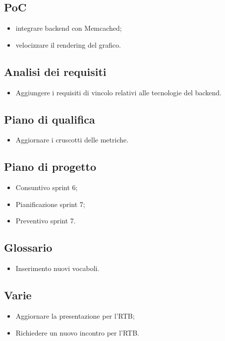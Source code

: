 \subsection{PoC}
\begin{itemize}
    \item integrare backend con Memcached;
    \item velocizzare il rendering del grafico.
\end{itemize}

\subsection{Analisi dei requisiti}
\begin{itemize}
    \item  Aggiungere i requisiti di vincolo relativi alle tecnologie del backend.
\end{itemize}

\subsection{Piano di qualifica}
\begin{itemize}
    \item Aggiornare i cruscotti delle metriche.
\end{itemize}

\subsection{Piano di progetto}
\begin{itemize}
    \item Consuntivo sprint 6;
    \item Pianificazione sprint 7;
    \item Preventivo sprint 7.
\end{itemize}

\subsection{Glossario}
\begin{itemize}
    \item Inserimento nuovi vocaboli.
\end{itemize}

\subsection{Varie}
\begin{itemize}
    \item Aggiornare la presentazione per l'RTB;
    \item Richiedere un nuovo incontro per l'RTB.
\end{itemize}